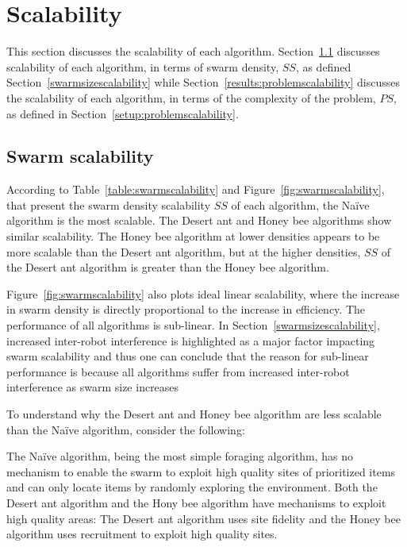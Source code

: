 \section{Scalability}
\label{results:scalability}

This section discusses the scalability of each algorithm. Section~\ref{results:swarmscalability} discusses scalability of each algorithm, in terms of swarm density, $SS$, as defined Section~\ref{swarmsizescalability} while Section~\ref{results:problemscalability} discusses the scalability of each algorithm, in terms of the complexity of the problem, $PS$, as defined in Section~\ref{setup:problemscalability}.

\subsection{Swarm scalability}
\label{results:swarmscalability}
According to Table~\ref{table:swarmscalability} and Figure~\ref{fig:swarmscalability}, that present the swarm density scalability $SS$ of each algorithm, the Na\"ive algorithm is the most scalable. The Desert ant and Honey bee algorithms show similar scalability. The Honey bee algorithm at lower densities appears to be more scalable than the Desert ant algorithm, but at the higher densities, $SS$ of the Desert ant algorithm is greater than the Honey bee algorithm. %

Figure~\ref{fig:swarmscalability} also plots ideal linear scalability, where the increase in swarm density is directly proportional to the increase in efficiency. The performance of all algorithms is sub-linear. In Section~\ref{swarmsizescalability}, increased inter-robot interference is highlighted as a major factor impacting swarm scalability and thus one can conclude that the reason for sub-linear performance is because all algorithms suffer from increased inter-robot interference as swarm size increases

To understand why the Desert ant and Honey bee algorithm are less scalable than the Na\"ive algorithm, consider the following:

The Na\"ive algorithm, being the most simple foraging algorithm, has no mechanism to enable the swarm to exploit high quality sites of prioritized items and can only locate items by randomly exploring the environment. Both the Desert ant algorithm and the Hony bee algorithm have mechanisms to exploit high quality areas: The Desert ant algorithm uses site fidelity and the Honey bee algorithm uses recruitment to exploit high quality sites. 

